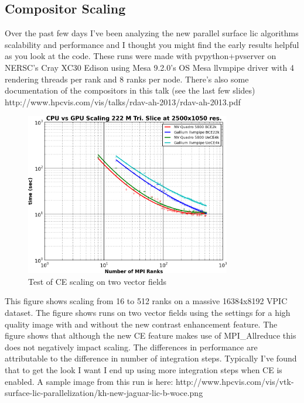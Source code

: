 \documentclass[a4paper,10pt]{article}
\begin{document}
\FloatBarrier






\subsection{Compositor Scaling}
Over the past few days I've been analyzing the new parallel surface lic algorithms scalability and performance and I thought you might find the early results helpful as you look at the code. These runs were made with pvpython+pvserver on NERSC's Cray XC30 Edison using Mesa 9.2.0's OS Mesa llvmpipe driver with 4 rendering threads per rank and 8 ranks per node. There's also some documentation of the compositors in this talk (see the last few slides) http://www.hpcvis.com/vis/talks/rdav-ah-2013/rdav-ah-2013.pdf

\begin{figure}[h]
 \centering
 \includegraphics[width=0.8\textwidth]{./scaling-ce-slice-gpu.png}
 \caption{Test of CE scaling on two vector fields}
 \label{fig:ce-scaling}
\end{figure}
This figure shows scaling from 16 to 512 ranks on a massive 16384x8192 VPIC dataset.  The figure shows runs on two vector fields using the settings for a high quality image with and without the new contrast enhancement feature. The figure shows that although the new CE feature makes use of MPI\_Allreduce this does not negatively impact scaling. The differences in performance are attributable to the difference in number of integration steps. Typically I've found that to get the look I want I end up using more integration steps when CE is enabled. A sample image from this run is here: http://www.hpcvis.com/vis/vtk-surface-lic-parallelization/kh-new-jaguar-lic-b-woce.png
\end{document}
